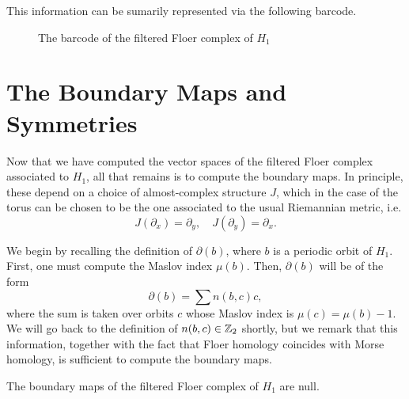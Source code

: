 \begin{prop}
This information can be sumarily represented via the following barcode.
\begin{figure}[H]
\centering
{}
\caption{The barcode of the filtered Floer complex of $H_1$}
\end{figure}
\end{prop}

\section{The Boundary Maps and Symmetries}\label{sec:symmetries}

Now that we have computed the vector spaces of the filtered Floer complex associated to $H_1$, all that remains is to compute the boundary maps. In principle, these depend on a choice of almost-complex structure $J$, which in the case of the torus can be chosen to be the one associated to the usual Riemannian metric, i.e.
\begin{equation}
J(\partial_x) = \partial_y, \quad J(\partial_y) = \partial_x.
\end{equation}

We begin by recalling the definition of $\partial(b)$, where $b$ is a periodic orbit of $H_1$. First, one must compute the Maslov index $\mu(b)$. Then, $\partial(b)$ will be of the form
\begin{equation}
\partial(b) = \sum n(b,c) c,
\end{equation}
where the sum is taken over orbits $c$ whose Maslov index is $\mu(c) = \mu(b)-1$. We will go back to the definition of $n(b,c) \in \mathbb{Z}_2$ shortly, but we remark that this information, together with the fact that Floer homology coincides with Morse homology, is sufficient to compute the boundary maps.

\begin{prop}
The boundary maps of the filtered Floer complex of $H_1$ are null.
\end{prop}


